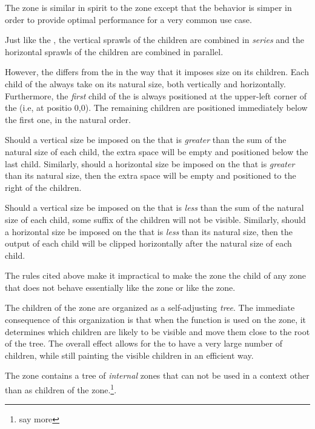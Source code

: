 The  zone is similar in spirit to the  zone
 except that the behavior is simper in
order to provide optimal performance for a very common use case.

Just like the , the vertical sprawls of the children are
combined in \emph{series} and the horizontal sprawls of the children
are combined in parallel.  

However, the  differs from the  in the way that
it imposes size on its children.  Each child of the 
always take on its natural size, both vertically and horizontally.
Furthermore, the \emph{first} child of the  is always
positioned at the upper-left corner of the  (i.e, at
positio 0,0).  The remaining children are positioned immediately below
the first one, in the natural order.  

Should a vertical size be imposed on the  that is
\emph{greater} than the sum of the natural size of each child, the
extra space will be empty and positioned below the last child.
Similarly, should a horizontal size be imposed on the 
that is \emph{greater} than its natural size, then the extra space
will be empty and positioned to the right of the children.

Should a vertical size be imposed on the  that is
\emph{less} than the sum of the natural size of each child, some
suffix of the children will not be visible.  Similarly, should a
horizontal size be imposed on the  that is \emph{less}
than its natural size, then the output of each child will be clipped
horizontally after the natural size of each child. 

The rules cited above make it impractical to make the 
zone the child of any zone that does not behave essentially like the
 zone or like the  zone.

The children of the  zone are organized as a
self-adjusting \emph{tree}.  The immediate consequence of this
organization is that when the function  is used on
the  zone, it determines which children are likely to be
visible and move them close to the root of the tree.  The overall
effect allows for the  to have a very large number of
children, while still painting the visible children in an efficient
way. 

The  zone contains a tree of \emph{internal} zones that
can not be used in a context other than as children of the
 zone.\footnote{say more}.

